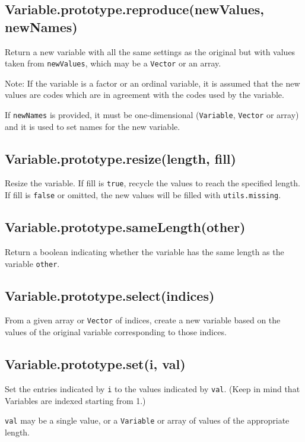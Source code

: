 \documentclass{article}
\begin{document}
    \subsection{Variable.prototype.reproduce(newValues, newNames)}
    Return a new variable with all the same settings as the original
but with values taken from \texttt{newValues}, which may be
a \texttt{Vector} or an array.


Note: If the variable is a factor or an ordinal variable, it is
assumed that the new values are codes which are in agreement
with the codes used by the variable.


If \texttt{newNames} is provided, it must be one-dimensional (\texttt{Variable}, \texttt{Vector}
or array) and it is used to set names for the new variable.


    \subsection{Variable.prototype.resize(length, fill)}
    Resize the variable.
If fill is \texttt{true}, recycle the values to reach the specified length.
If fill is \texttt{false} or omitted, the new values will be filled with \texttt{utils.missing}.


    \subsection{Variable.prototype.sameLength(other)}
    Return a boolean indicating whether the variable has the same length
as the variable \texttt{other}.


    \subsection{Variable.prototype.select(indices)}
    From a given array or \texttt{Vector} of indices, create a new variable based on the
values of the original variable corresponding to those indices.


    \subsection{Variable.prototype.set(i, val)}
    Set the entries indicated by \texttt{i} to the values indicated by \texttt{val}.
(Keep in mind that Variables are indexed starting from 1.)


\texttt{val} may be a single value, or a \texttt{Variable} or array of values of
the appropriate length.
\end{document}
